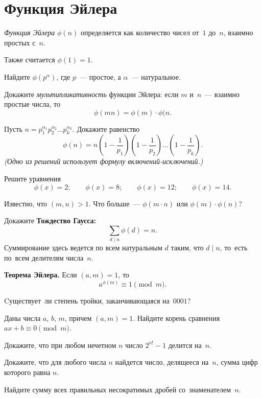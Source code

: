 
\section*{Функция Эйлера}



\emph{Функция Эйлера} $\phi(n)$ определяется как количество чисел от~$1$
до~$n$, взаимно простых с~$n$.

Также считается $\phi(1) = 1$.

\begin{problems}

\item
Найдите $\phi(p^\alpha)$, где $p$~--- простое, а $\alpha$~--- натуральное.

\item
Докажите \emph{мультипликативность} функции Эйлера: если $m$ и~$n$~--- взаимно
простые числа, то
\[
    \phi(mn) = \phi(m) \cdot \phi(n
.\]

\item
Пусть $n = p_1^{\alpha_1} p_2^{\alpha_2} \ldots p_k^{\alpha_k}$.
Докажите равенство
\[
    \phi (n)
=
    n
    \left(1 - \frac{1}{p_1}\right)
    \left(1 - \frac{1}{p_2}\right)
    \ldots
    \left(1 - \frac{1}{p_k}\right)
.\]
\emph{(Одно из решений использует формулу включений-исключений.)}
 
\item
Решите уравнения
\[
    \phi (x) = 2
;\qquad
    \phi (x) = 8
;\qquad
    \phi (x) = 12
;\qquad
    \phi (x) = 14
.\]

\item
Известно, что $(m, n) > 1$.
Что больше~--- $ \phi (m \cdot n)$ или $\phi (m) \cdot \phi(n)$?

\item
Докажите \textbf{Тождество Гаусса:}
\[
    \sum_{d \mid n} \phi(d) = n.
\]
Суммирование здесь ведется по всем натуральным $d$ таким, что $d \mid n$,
то~есть по~всем делителям числа~$n$.

\item\textbf{Теорема Эйлера.}
Если $(a, m) = 1$, то
\[
    a^{\phi(m)} \equiv 1 \pmod m
.\]

\item
Cуществует~ли степень тройки, заканчивающаяся на~$0001$?

\item
Даны числа $a$, $b$, $m$, причем $(a, m) = 1$.
Найдите корень сравнения $a x + b \equiv 0 \pmod m$.

\item
Докажите, что при любом нечетном $n$ число $2^{n!} - 1$ делится на~$n$.

\item
Докажите, что для любого числа $n$ найдется число, делящееся на~$n$, сумма цифр
которого равна $n$.

\item
Найдите сумму всех правильных несократимых дробей со~знаменателем~$n$.

\end{problems}

